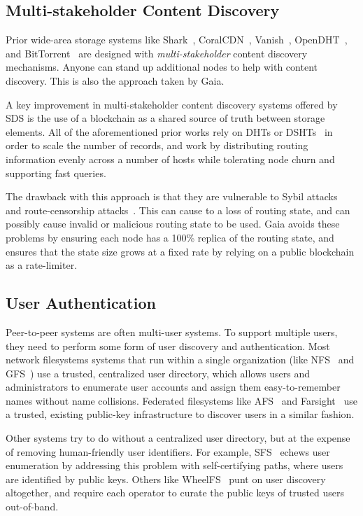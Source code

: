 \subsection{Multi-stakeholder Content Discovery}

Prior wide-area storage systems like Shark~\cite{shark}, CoralCDN~\cite{coral}, Vanish~\cite{vanish},
OpenDHT~\cite{opendht}, and BitTorrent~\cite{bittorrent} are designed with
\emph{multi-stakeholder} content discovery mechanisms.  Anyone can stand up additional
nodes to help with content discovery.  This is also the approach taken by Gaia.

A key improvement in multi-stakeholder content discovery systems offered by SDS
is the use of a blockchain as a shared source of truth between storage elements.
All of the aforementioned prior works rely on DHTs or DSHTs~\cite{dsht} in order to
scale the number of records, and work by distributing routing information
evenly across a number of hosts while tolerating node churn and supporting
fast queries.

The drawback with this approach is that they are vulnerable to Sybil
attacks~\cite{sybil-attack} and route-censorship
attacks~\cite{dht-route-censorship}.  This can cause to a loss of routing state,
and can possibly cause invalid or malicious routing state to be used.
Gaia avoids these problems by ensuring each node has a 100\% replica of the
routing state, and ensures that the state size grows at a fixed rate by relying
on a public blockchain as a rate-limiter.

\subsection{User Authentication}

Peer-to-peer systems are often multi-user systems.  To support multiple users,
they need to perform some form of user discovery and authentication.
Most network filesystems systems that run within a single organization (like
NFS~\cite{nfs} and GFS~\cite{gfs}) use a trusted, centralized user directory,
which allows users and administrators to enumerate user accounts and assign them
easy-to-remember names without name collisions.
Federated filesystems like AFS~\cite{afs} and Farsight~\cite{farsight} use a
trusted, existing public-key infrastructure to discover users in a similar
fashion.

Other systems try to do without a centralized user directory, but at the expense
of removing human-friendly user identifiers.  For example,
SFS~\cite{sfs} echews user enumeration by addressing this problem with
self-certifying paths, where users are identified by public keys.
Others like WheelFS~\cite{wheelfs} punt on user discovery altogether, and
require each operator to curate the public keys of trusted users out-of-band.

